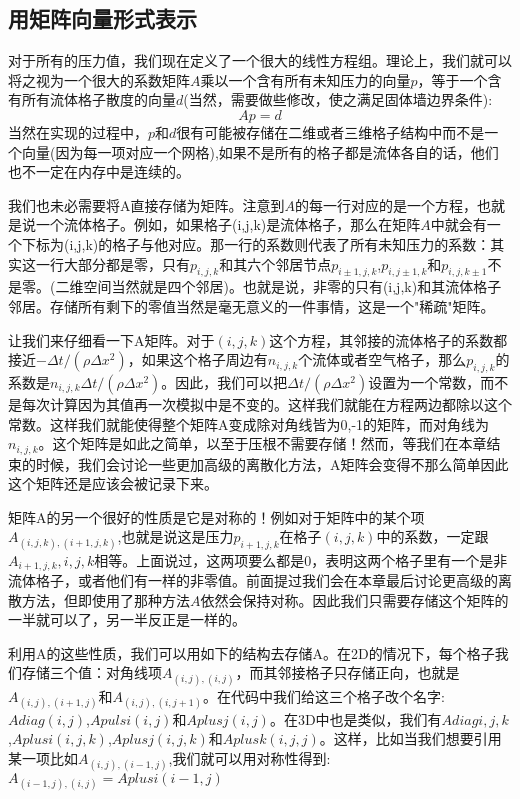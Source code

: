 \documentclass{article}
\begin{document}
\subsection{用矩阵向量形式表示}
对于所有的压力值，我们现在定义了一个很大的线性方程组。理论上，我们就可以将之视为一个很大的系数矩阵$A$乘以一个含有所有未知压力的向量$p$，等于一个含有所有流体格子散度的向量$d$(当然，需要做些修改，使之满足固体墙边界条件):
\begin{equation}
Ap=d
\end{equation}
当然在实现的过程中，$p$和$d$很有可能被存储在二维或者三维格子结构中而不是一个向量(因为每一项对应一个网格),如果不是所有的格子都是流体各自的话，他们也不一定在内存中是连续的。
\par
我们也未必需要将A直接存储为矩阵。注意到$A$的每一行对应的是一个方程，也就是说一个流体格子。例如，如果格子(i,j,k)是流体格子，那么在矩阵$A$中就会有一个下标为(i,j,k)的格子与他对应。那一行的系数则代表了所有未知压力的系数：其实这一行大部分都是零，只有$p_{i,j,k}$和其六个邻居节点$p_{i\pm{1},j,k}$,$p_{i,j\pm{1},k}$和$p_{i,j,k\pm{1}}$不是零。(二维空间当然就是四个邻居)。也就是说，非零的只有(i,j,k)和其流体格子邻居。存储所有剩下的零值当然是毫无意义的一件事情，这是一个"稀疏"矩阵。
\par
让我们来仔细看一下A矩阵。对于$(i,j,k)$这个方程，其邻接的流体格子的系数都接近$-\Delta{t}/(\rho\Delta{x}^2)$，如果这个格子周边有$n_{i,j,k}$个流体或者空气格子，那么$p_{i,j,k}$的系数是$n_{i,j,k}\Delta{t}/(\rho\Delta{x}^2)$。因此，我们可以把$\Delta{t}/(\rho\Delta{x}^2)$设置为一个常数，而不是每次计算因为其值再一次模拟中是不变的。这样我们就能在方程两边都除以这个常数。这样我们就能使得整个矩阵A变成除对角线皆为0,-1的矩阵，而对角线为$n_{i,j,k}$。这个矩阵是如此之简单，以至于压根不需要存储！然而，等我们在本章结束的时候，我们会讨论一些更加高级的离散化方法，A矩阵会变得不那么简单因此这个矩阵还是应该会被记录下来。
\par
矩阵A的另一个很好的性质是它是对称的！例如对于矩阵中的某个项$A_{(i,j,k),(i+1,j,k)}$,也就是说这是压力$p_{i+1,j,k}$在格子$(i,j,k)$中的系数，一定跟$A_{i+1,j,k},{i,j,k}$相等。上面说过，这两项要么都是0，表明这两个格子里有一个是非流体格子，或者他们有一样的非零值。前面提过我们会在本章最后讨论更高级的离散方法，但即使用了那种方法$A$依然会保持对称。因此我们只需要存储这个矩阵的一半就可以了，另一半反正是一样的。
\par
利用A的这些性质，我们可以用如下的结构去存储A。在2D的情况下，每个格子我们存储三个值：对角线项$A_{(i,j),(i,j)}$，而其邻接格子只存储正向，也就是$A_{(i,j),(i+1,j)}$和$A_{(i,j),(i,j+1)}$。在代码中我们给这三个格子改个名字:$Adiag(i,j)$,$Apulsi(i,j)$和$Aplusj(i,j)$。在3D中也是类似，我们有$Adiag{i,j,k}$,$Aplusi(i,j,k)$,$Aplusj(i,j,k)$和$Aplusk(i,j,j)$。这样，比如当我们想要引用某一项比如$A_{(i,j),(i-1,j)}$,我们就可以用对称性得到:$A_{(i-1,j),(i,j)}=Aplusi(i-1,j)$
\end{document}
